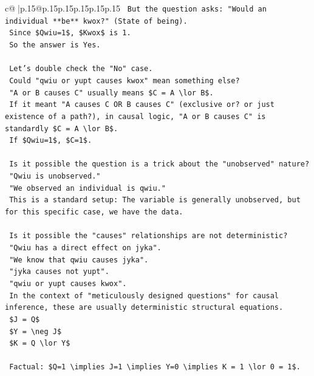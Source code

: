 \documentclass{article}
\begin{document}
{\begin{supertabular}{c@{$\;$}|p{.15\linewidth}@{}p{.15\linewidth}p{.15\linewidth}p{.15\linewidth}p{.15\linewidth}p{.15\linewidth}}
{{{\texttt{    But the question asks: "Would an individual **be** kwox?" (State of being).} \\
\texttt{    Since \$Qwiu=1\$, \$Kwox\$ is 1.} \\
\texttt{    So the answer is Yes.} \\
\\ 
\texttt{    Let's double check the "No" case.} \\
\texttt{    Could "qwiu or yupt causes kwox" mean something else?} \\
\texttt{    "A or B causes C" usually means \$C = A \textbackslash{}lor B\$.} \\
\texttt{    If it meant "A causes C OR B causes C" (exclusive or? or just existence of a path?), in causal logic, "A or B causes C" is standardly \$C = A \textbackslash{}lor B\$.} \\
\texttt{    If \$Qwiu=1\$, \$C=1\$.} \\
\\ 
\texttt{    Is it possible the question is a trick about the "unobserved" nature?} \\
\texttt{    "Qwiu is unobserved."} \\
\texttt{    "We observed an individual is qwiu."} \\
\texttt{    This is a standard setup: The variable is generally unobserved, but for this specific case, we have the data.} \\
\\ 
\texttt{    Is it possible the "causes" relationships are not deterministic?} \\
\texttt{    "Qwiu has a direct effect on jyka".} \\
\texttt{    "We know that qwiu causes jyka".} \\
\texttt{    "jyka causes not yupt".} \\
\texttt{    "qwiu or yupt causes kwox".} \\
\texttt{    In the context of "meticulously designed questions" for causal inference, these are usually deterministic structural equations.} \\
\texttt{    \$J = Q\$} \\
\texttt{    \$Y = \textbackslash{}neg J\$} \\
\texttt{    \$K = Q \textbackslash{}lor Y\$} \\
\\ 
\texttt{    Factual: \$Q=1 \textbackslash{}implies J=1 \textbackslash{}implies Y=0 \textbackslash{}implies K = 1 \textbackslash{}lor 0 = 1\$.} \\
}}}
\end{supertabular}}
\end{document}
